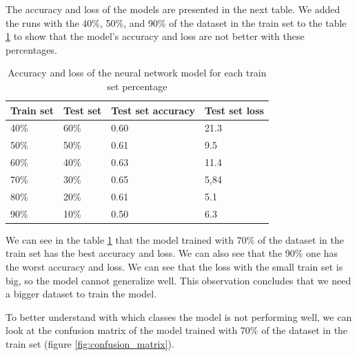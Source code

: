 The accuracy and loss of the models are presented in the next table. We added the runs with the 40\%, 50\%, and 90\% of the dataset in the train set to the table \ref{tab:neural_network_results} to show that the model's accuracy and loss are not better with these percentages.

\begin{table}[H]
    \centering
    \begin{tabular}{|l|l|l|l|}
    \hline
    \textbf{Train set} & \textbf{Test set} & \textbf{Test set accuracy} & \textbf{Test set loss} \\ \hline
    40\%               & 60\%              & 0.60              & 21.3        \\ \hline
    50\%               & 50\%              & 0.61              & 9.5         \\ \hline
    60\%               & 40\%              & 0.63              & 11.4        \\ \hline
    70\%               & 30\%              & 0.65              & 5,84        \\ \hline
    80\%               & 20\%              & 0.61              & 5.1         \\ \hline
    90\%               & 10\%              & 0.50              & 6.3         \\ \hline
    \end{tabular}
    \caption{Accuracy and loss of the neural network model for each train set percentage}
    \label{tab:neural_network_results}
\end{table}

We can see in the table \ref{tab:neural_network_results} that the model trained with 70\% of the dataset in the train set has the best accuracy and loss. We can also see that the 90\% one has the worst accuracy and loss. We can see that the loss with the small train set is big, so the model cannot generalize well. This observation concludes that we need a bigger dataset to train the model.

To better understand with which classes the model is not performing well, we can look at the confusion matrix of the model trained with 70\% of the dataset in the train set (figure \ref{fig:confusion_matrix}).

